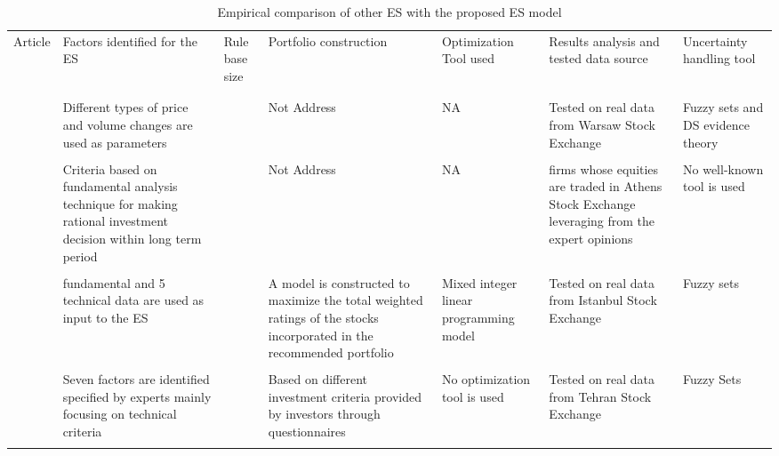 \documentclass{ws-ijufks}
\begin{document}
\begin{table}[!h]
	\tiny
	\caption{Empirical comparison of other ES with the proposed ES model}
	\begin{center}
		\label{tab:performance_comparison}
		\begin{tabular}{ >{\centering\arraybackslash}m{0.25in}  
				>{\centering\arraybackslash}m{0.75in} >{\centering\arraybackslash}m{0.25in} 
				>{\centering\arraybackslash}m{0.65in} >{\centering\arraybackslash}m{0.5in}
				>{\centering\arraybackslash}m{0.75in} 
				>{\centering\arraybackslash}m{0.5in}}
			\toprule
			
			Article & Factors identified for the ES & Rule base size & 
			Portfolio construction & Optimization Tool used & Results analysis and tested data source & Uncertainty 
			handling tool \\
			\vspace{0.25cm}\\
			\colrule
			\vspace{0.5cm} \\
					
			\cite{Dymova2010new} & Different types of price and volume changes are used as parameters & 108 & Not 
			Address & 
			NA & Tested on real data from Warsaw Stock Exchange & Fuzzy sets and DS evidence theory\\
				\vspace{0.5cm} \\
				
			\cite{Xidonas2009} & Criteria based on fundamental analysis technique for making rational investment 
			decision 
			within long term period & 1406 & Not Address & NA & firms whose equities are traded in Athens Stock 
			Exchange 
			leveraging from the expert opinions & No well-known tool is used \\
			\vspace{0.5cm} \\
			
			\cite{Yunusoglu2013fuzzy} & 15 fundamental and 5 technical data are used as input to the ES & 81 & A model 
			is constructed to maximize the total weighted ratings of the stocks incorporated in the recommended 
			portfolio & Mixed integer linear programming model & Tested on real data from Istanbul Stock Exchange & 
			Fuzzy sets \\
			\vspace{0.5cm} \\
			
			\cite{Fasanghari2010design} & Seven factors are identified specified by experts mainly focusing on 
			technical criteria & 932 & Based on different investment criteria provided by investors through 
			questionnaires & No optimization tool is used & Tested on real data from Tehran Stock Exchange & Fuzzy Sets 
			\\
				\vspace{0.5cm} \\
			

\end{tabular}
\end{center}
\end{table}
\end{document}
